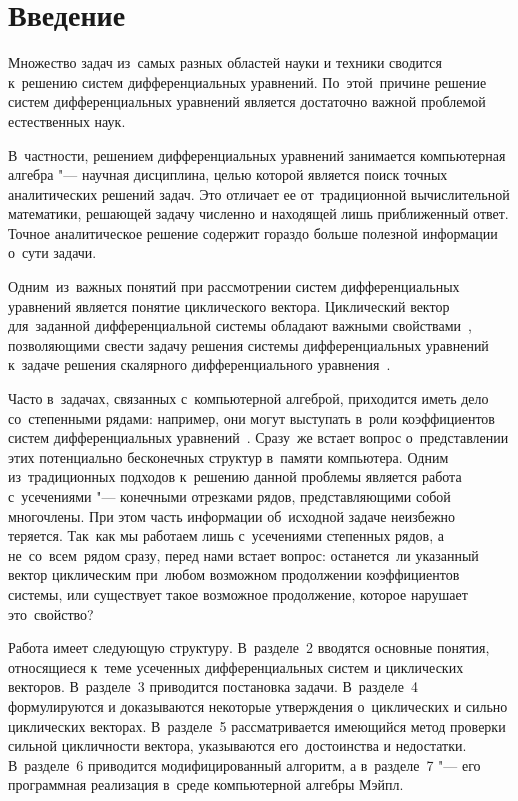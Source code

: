 \section{Введение}

Множество задач из~самых разных областей науки и техники сводится к~решению систем дифференциальных уравнений.
По~этой~причине решение систем дифференциальных уравнений является достаточно важной проблемой естественных наук.

В~частности, решением дифференциальных уравнений занимается компьютерная алгебра "--- научная дисциплина,
целью которой является поиск точных аналитических решений задач.
Это отличает ее от~традиционной вычислительной математики, решающей задачу численно и находящей лишь приближенный ответ.
Точное аналитическое решение содержит гораздо больше полезной информации о~сути задачи.
\medskip

Одним~из~важных понятий при рассмотрении систем дифференциальных уравнений является понятие циклического вектора.
Циклический вектор для~заданной дифференциальной системы обладают важными свойствами~\cite{litKovacic},
позволяющими свести задачу решения системы дифференциальных уравнений
к~задаче решения скалярного дифференциального уравнения~\cite{litAbramovResolvingSequences}.

Часто в~задачах, связанных с~компьютерной алгеброй, приходится иметь дело со~степенными рядами:
например, они могут выступать в~роли коэффициентов систем дифференциальных уравнений~\cite{litAbramovPowerSeries}.
Сразу~же встает вопрос о~представлении этих потенциально бесконечных структур в~памяти компьютера.
Одним из~традиционных подходов к~решению данной проблемы является работа с~усечениями "--- конечными отрезками рядов, представляющими собой многочлены.
При этом часть информации об~исходной задаче неизбежно теряется.
Так~как мы работаем лишь с~усечениями степенных рядов, а не~со~всем~рядом сразу, перед нами встает вопрос:
останется~ли указанный вектор циклическим при~любом возможном продолжении коэффициентов системы,
или существует такое возможное продолжение, которое нарушает это~свойство?
\medskip

Работа имеет следующую структуру.
В~разделе~2 вводятся основные понятия, относящиеся к~теме усеченных дифференциальных систем и циклических векторов.
В~разделе~3 приводится постановка задачи.
В~разделе~4 формулируются и доказываются некоторые утверждения о~циклических и сильно циклических векторах.
В~разделе~5 рассматривается имеющийся метод проверки сильной цикличности вектора, указываются его~достоинства и недостатки.
В~разделе~6 приводится модифицированный алгоритм,
а в~разделе~7 "--- его программная реализация в~среде компьютерной алгебры Мэйпл.

